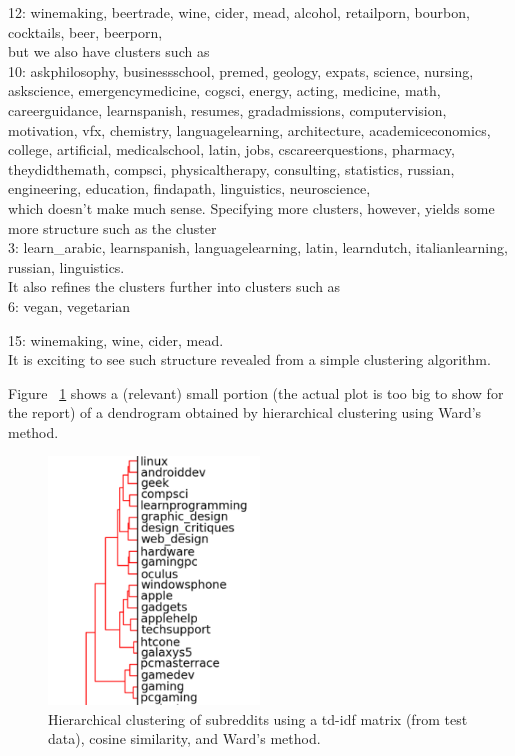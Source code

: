 \documentclass[letterpaper]{article}
\numberwithin{equation}{subsection}
\begin{document}
12:    winemaking, beertrade, wine, cider, mead, alcohol, retailporn, bourbon, cocktails, beer, beerporn,
\text{}\\

\noindent but we also have clusters such as
\text{}\\

10:    askphilosophy, businessschool, premed, geology, expats, science, nursing, askscience, emergencymedicine, cogsci, energy, acting, medicine, math, careerguidance, learnspanish, resumes, gradadmissions, computervision, motivation, vfx, chemistry, languagelearning, architecture, academiceconomics, college, artificial, medicalschool, latin, jobs, cscareerquestions, pharmacy, theydidthemath, compsci, physicaltherapy, consulting, statistics, russian, engineering, education, findapath, linguistics, neuroscience,
\text{}\\

\noindent which doesn't make much sense. Specifying more clusters, however, yields some more structure such as the cluster
\text{}\\

3:    learn\_arabic, learnspanish, languagelearning, latin, learndutch, italianlearning, russian, linguistics.
\text{}\\

It also refines the clusters further into clusters such as
\text{}\\

6:    vegan, vegetarian

15:    winemaking, wine, cider, mead.
\text{}\\

It is exciting to see such structure revealed from a simple clustering algorithm.

Figure ~\ref{fig:fig1} shows a (relevant) small portion (the actual plot is too big to show for the report) of a dendrogram obtained by hierarchical clustering using Ward's method.

\begin{figure}[h!]
    \label{fig:fig1}
  \caption{Hierarchical clustering of subreddits using a td-idf matrix (from test data), cosine similarity, and Ward's method.}
  \centering
  \includegraphics[width=0.5\textwidth]{sample1}
\end{figure}
\end{document}
